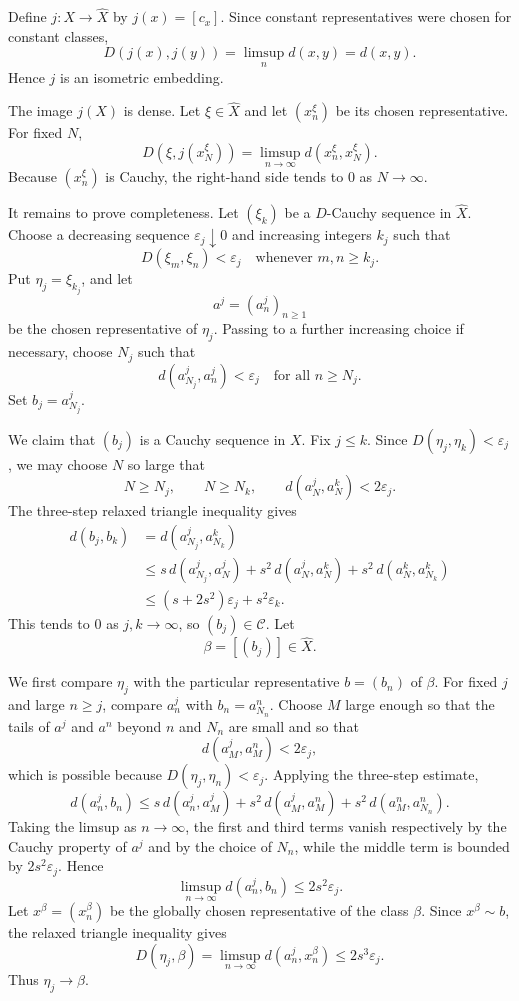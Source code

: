 \documentclass[11pt]{article}
\newcommand{\calC}{\mathcal C}
\begin{document}
Define \(j:X\to\widehat X\) by \(j(x)=[c_x]\).  Since constant representatives
were chosen for constant classes,
\[
        D(j(x),j(y))=\limsup_n d(x,y)=d(x,y).
\]
Hence \(j\) is an isometric embedding.

The image \(j(X)\) is dense.  Let \(\xi\in\widehat X\) and let
\((x^\xi_n)\) be its chosen representative.  For fixed \(N\),
\[
        D(\xi,j(x^\xi_N))
        =\limsup_{n\to\infty}d(x^\xi_n,x^\xi_N).
\]
Because \((x^\xi_n)\) is Cauchy, the right-hand side tends to \(0\) as
\(N\to\infty\).

It remains to prove completeness.  Let \((\xi_k)\) be a \(D\)-Cauchy sequence
in \(\widehat X\).  Choose a decreasing sequence \(\varepsilon_j\downarrow0\)
and increasing integers \(k_j\) such that
\[
        D(\xi_m,\xi_n)<\varepsilon_j
        \quad\text{whenever }m,n\ge k_j .
\]
Put \(\eta_j=\xi_{k_j}\), and let
\[
        a^j=(a^j_n)_{n\ge1}
\]
be the chosen representative of \(\eta_j\).  Passing to a further increasing
choice if necessary, choose \(N_j\) such that
\[
        d(a^j_{N_j},a^j_n)<\varepsilon_j
        \quad\text{for all } n\ge N_j .
\]
Set \(b_j=a^j_{N_j}\).

We claim that \((b_j)\) is a Cauchy sequence in \(X\).  Fix \(j\le k\).  Since
\(D(\eta_j,\eta_k)<\varepsilon_j\), we may choose \(N\) so large that
\[
        N\ge N_j,\qquad N\ge N_k,\qquad
        d(a^j_N,a^k_N)<2\varepsilon_j .
\]
The three-step relaxed triangle inequality gives
\[
\begin{aligned}
d(b_j,b_k)
&=d(a^j_{N_j},a^k_{N_k})\\
&\le s\,d(a^j_{N_j},a^j_N)
   +s^2\,d(a^j_N,a^k_N)
   +s^2\,d(a^k_N,a^k_{N_k})  \\
&\le (s+2s^2)\varepsilon_j+s^2\varepsilon_k .
\end{aligned}
\]
This tends to \(0\) as \(j,k\to\infty\), so \((b_j)\in\calC\).  Let
\[
        \beta=[(b_j)]\in\widehat X.
\]

We first compare \(\eta_j\) with the particular representative
\(b=(b_n)\) of \(\beta\).  For fixed \(j\) and large \(n\ge j\), compare
\(a^j_n\) with \(b_n=a^n_{N_n}\).  Choose \(M\) large enough so that
the tails of \(a^j\) and \(a^n\) beyond \(n\) and \(N_n\) are small and so that
\[
        d(a^j_M,a^n_M)<2\varepsilon_j ,
\]
which is possible because \(D(\eta_j,\eta_n)<\varepsilon_j\).  Applying the
three-step estimate,
\[
 d(a^j_n,b_n)
 \le s\,d(a^j_n,a^j_M)
    +s^2\,d(a^j_M,a^n_M)
    +s^2\,d(a^n_M,a^n_{N_n}).
\]
Taking the limsup as \(n\to\infty\), the first and third terms vanish
respectively by the Cauchy property of \(a^j\) and by the choice of \(N_n\),
while the middle term is bounded by \(2s^2\varepsilon_j\).  Hence
\[
        \limsup_{n\to\infty}d(a^j_n,b_n)\le 2s^2\varepsilon_j .
\]
Let \(x^\beta=(x^\beta_n)\) be the globally chosen representative of the
class \(\beta\).  Since \(x^\beta\sim b\), the relaxed triangle inequality
gives
\[
        D(\eta_j,\beta)
        =\limsup_{n\to\infty}d(a^j_n,x^\beta_n)
        \le 2s^3\varepsilon_j .
\]
Thus \(\eta_j\to\beta\).
\end{document}
